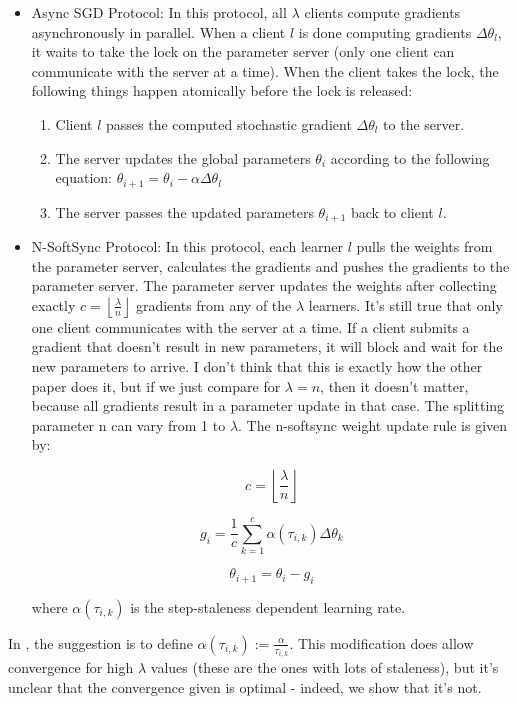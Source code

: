 \documentclass{article} %
\begin{document}
\begin{itemize}
\item Async SGD Protocol: In this protocol, all $\lambda$ clients compute gradients asynchronously in parallel.
  When a client $l$ is done computing gradients $\Delta \theta_l$,
  it waits to take the lock on the parameter server (only one client can communicate with the
  server at a time). When the client takes the lock, the following things happen atomically before the lock is released:
  \begin{enumerate}
    \item Client $l$ passes the computed stochastic gradient $\Delta \theta_l$ to the server.
    \item The server updates the global parameters $\theta_i$ according to the following equation:
      $ \theta_{i + 1} = \theta_{i} - \alpha \Delta \theta_l$
    \item The server passes the updated parameters $\theta_{i + 1}$ back to client $l$. 
  \end{enumerate}

\item N-SoftSync Protocol: In this protocol, each learner $l$ pulls the weights from the parameter server,
  calculates the gradients and pushes the gradients to the parameter server.
  The parameter server updates the weights after collecting exactly
  $c = \left \lfloor{\frac{\lambda}{n}}\right \rfloor $
  gradients from any of the $\lambda$ learners.
  It's still true that only one client communicates with the server at a time.
  If a client submits a gradient that doesn't result in new parameters,
  it will block and wait for the new parameters to arrive.
  I don't think that this is exactly how the other paper does it,
  but if we just compare for $\lambda = n$, then it doesn't matter,
  because all gradients result in a parameter update in that case.
  The splitting parameter n can vary from 1 to $\lambda$.
  The n-softsync weight update rule is given by:

  $$c = \left \lfloor{\frac{\lambda}{n}}\right \rfloor $$

  $$  g_i = \frac{1}{c} \sum_{k = 1}^{c} \alpha(\tau_{i,k})\Delta \theta_k$$

  $$ \theta_{i + 1} = \theta_{i} - g_i $$

  where $\alpha(\tau_{i,k})$ is the step-staleness dependent learning rate.  

  
\end{itemize}

In \cite{Suyog}, the suggestion is to define $\alpha(\tau_{i,k}) := \frac{\alpha}{\tau_{i,k}}$. 
This modification does allow convergence for high $\lambda$ values (these are the ones with lots of staleness),
but it's unclear that the convergence given is optimal - indeed, we show that it's not.
\end{document}
